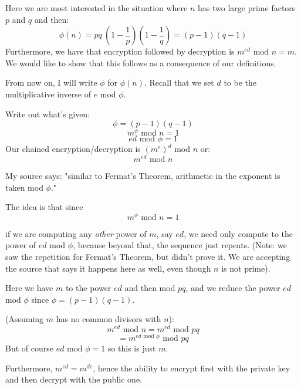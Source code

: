 \documentclass[11pt, oneside]{article}
\begin{document}
Here we are most interested in the situation where $n$ has two large prime factors $p$ and $q$ and then:
\[ \phi(n) = pq \ (1 - \frac{1}{p}) (1 - \frac{1}{q}) = (p - 1)(q - 1)  \]
Furthermore, we have that encryption followed by decryption is $m^{ed} \text{ mod } n = m$.  We would like to show that this follows as a consequence of our definitions.  

From now on, I will write $\phi$ for $\phi(n)$.  Recall that we set $d$ to be the multiplicative inverse of $e$ mod $\phi$. 

Write out what's given:
\[ \phi = (p - 1)(q - 1) \]
\[ m^{\phi} \text{ mod } n = 1 \]
\[ ed  \text{ mod } \phi = 1 \]
Our chained encryption/decryption is $(m^{e})^{d}$ mod $n$  or:
\[ m^{ed} \text{ mod } n \]

My source says:  "similar to Fermat's Theorem, arithmetic in the exponent is taken mod $\phi$."  

The idea is that since  
\[ m^{\phi} \text{ mod } n = 1 \]

if we are computing any \emph{other} power of $m$, say $ed$, we need only compute to the power of $ed$ mod $\phi$, because beyond that, the sequence just repeats.  (Note:  we saw the repetition for Fermat's Theorem, but didn't prove it.  We are accepting the source that says it happens here as well, even though $n$ is not prime).

Here we have $m$  to the power $ed$ and then mod $pq$, and we reduce the power $ed$ mod $\phi$ since $\phi = (p-1)(q-1)$.

(Assuming $m$ has no common divisors with $n$):
\[ m^{ed} \text{ mod } n = m^{ed} \text{ mod } pq \]
\[ = m^{ed \text{ mod } \phi} \text{ mod } pq \]
But of course $ed \text{ mod } \phi = 1$ so this is just $m$.

Furthermore, $m^{ed} = m^{de}$, hence the ability to encrypt first with the private key and then decrypt with the public one.
\end{document}

